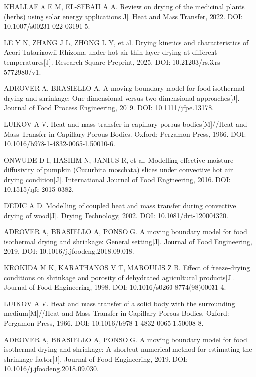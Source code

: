 KHALLAF A E M, EL-SEBAII A A. Review on drying of the medicinal plants (herbs)
using solar energy applications[J]. Heat and Mass Transfer, 2022.
DOI: 10.1007/s00231-022-03191-5.

LE Y N, ZHANG J L, ZHONG L Y, et al. Drying kinetics and characteristics of
Acori Tatarinowii Rhizoma under hot air thin-layer drying at different
temperatures[J]. Research Square Preprint, 2025.
DOI: 10.21203/rs.3.rs-5772980/v1.

ADROVER A, BRASIELLO A. A moving boundary model for food isothermal drying and
shrinkage: One-dimensional versus two-dimensional approaches[J]. Journal of
Food Process Engineering, 2019. DOI: 10.1111/jfpe.13178.

LUIKOV A V. Heat and mass transfer in capillary-porous bodies[M]//Heat and Mass
Transfer in Capillary-Porous Bodies. Oxford: Pergamon Press, 1966.
DOI: 10.1016/b978-1-4832-0065-1.50010-6.

ONWUDE D I, HASHIM N, JANIUS R, et al. Modelling effective moisture diffusivity
of pumpkin (Cucurbita moschata) slices under convective hot air drying
condition[J]. International Journal of Food Engineering, 2016.
DOI: 10.1515/ijfe-2015-0382.

DEDIC A D. Modelling of coupled heat and mass transfer during convective drying
of wood[J]. Drying Technology, 2002. DOI: 10.1081/drt-120004320.

ADROVER A, BRASIELLO A, PONSO G. A moving boundary model for food isothermal
drying and shrinkage: General setting[J]. Journal of Food Engineering, 2019.
DOI: 10.1016/j.jfoodeng.2018.09.018.

KROKIDA M K, KARATHANOS V T, MAROULIS Z B. Effect of freeze-drying conditions
on shrinkage and porosity of dehydrated agricultural products[J]. Journal of
Food Engineering, 1998. DOI: 10.1016/s0260-8774(98)00031-4.

LUIKOV A V. Heat and mass transfer of a solid body with the surrounding
medium[M]//Heat and Mass Transfer in Capillary-Porous Bodies. Oxford: Pergamon
Press, 1966. DOI: 10.1016/b978-1-4832-0065-1.50008-8.

ADROVER A, BRASIELLO A, PONSO G. A moving boundary model for food isothermal
drying and shrinkage: A shortcut numerical method for estimating the shrinkage
factor[J]. Journal of Food Engineering, 2019.
DOI: 10.1016/j.jfoodeng.2018.09.030.

